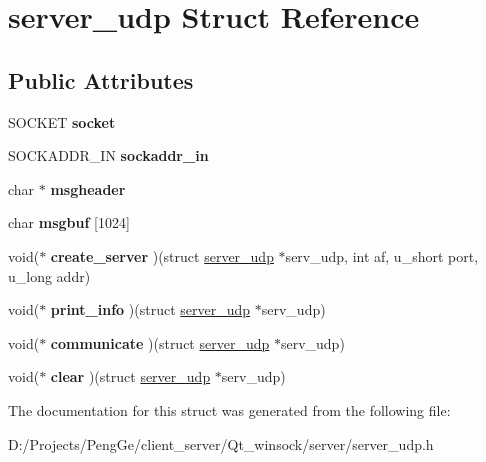 \hypertarget{structserver__udp}{}\section{server\+\_\+udp Struct Reference}
\label{structserver__udp}
\subsection*{Public Attributes}
\begin{DoxyCompactItemize}
\item 
\hypertarget{structserver__udp_ab090cc6f567a493e4da718bc3185ca86}{}S\+O\+C\+K\+E\+T {\bfseries socket}\label{structserver__udp_ab090cc6f567a493e4da718bc3185ca86}

\item 
\hypertarget{structserver__udp_a72556f4425670f0e12081a407fb19872}{}S\+O\+C\+K\+A\+D\+D\+R\+\_\+\+I\+N {\bfseries sockaddr\+\_\+in}\label{structserver__udp_a72556f4425670f0e12081a407fb19872}

\item 
\hypertarget{structserver__udp_a6a77091474e01654eba5c0781ef442af}{}char $\ast$ {\bfseries msgheader}\label{structserver__udp_a6a77091474e01654eba5c0781ef442af}

\item 
\hypertarget{structserver__udp_afc56237844189c201bc70c0672aaa058}{}char {\bfseries msgbuf} \mbox{[}1024\mbox{]}\label{structserver__udp_afc56237844189c201bc70c0672aaa058}

\item 
\hypertarget{structserver__udp_aaac05f1162fdc6b12c0f109ae1607b5a}{}void($\ast$ {\bfseries create\+\_\+server} )(struct \hyperlink{structserver__udp}{server\+\_\+udp} $\ast$serv\+\_\+udp, int af, u\+\_\+short port, u\+\_\+long addr)\label{structserver__udp_aaac05f1162fdc6b12c0f109ae1607b5a}

\item 
\hypertarget{structserver__udp_a5aabc039d77926226888b447613c02d3}{}void($\ast$ {\bfseries print\+\_\+info} )(struct \hyperlink{structserver__udp}{server\+\_\+udp} $\ast$serv\+\_\+udp)\label{structserver__udp_a5aabc039d77926226888b447613c02d3}

\item 
\hypertarget{structserver__udp_a1e93da5bbaa5022aabc0a9d352a34b56}{}void($\ast$ {\bfseries communicate} )(struct \hyperlink{structserver__udp}{server\+\_\+udp} $\ast$serv\+\_\+udp)\label{structserver__udp_a1e93da5bbaa5022aabc0a9d352a34b56}

\item 
\hypertarget{structserver__udp_a9f7fee1394546a9bc80cfb75cbb0cb39}{}void($\ast$ {\bfseries clear} )(struct \hyperlink{structserver__udp}{server\+\_\+udp} $\ast$serv\+\_\+udp)\label{structserver__udp_a9f7fee1394546a9bc80cfb75cbb0cb39}

\end{DoxyCompactItemize}


The documentation for this struct was generated from the following file\+:\begin{DoxyCompactItemize}
\item 
D\+:/\+Projects/\+Peng\+Ge/client\+\_\+server/\+Qt\+\_\+winsock/server/server\+\_\+udp.\+h\end{DoxyCompactItemize}
